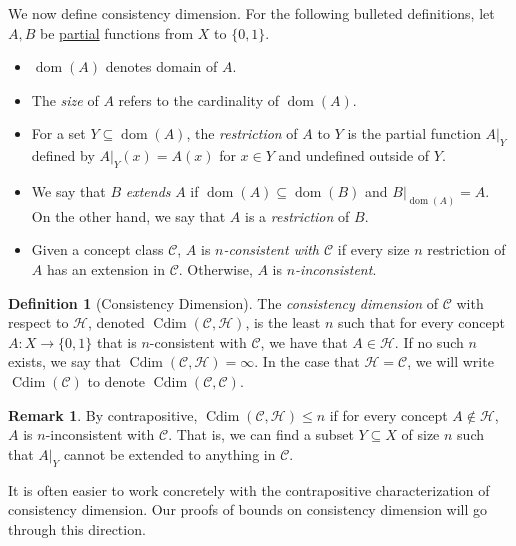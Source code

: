 \documentclass[11pt,a4paper]{amsart}
\theoremstyle{definition}
\newtheorem{definition}{Definition}
\newtheorem{remark}{Remark}
\newcommand{\mc}{\mathcal}
\DeclareMathOperator{\dom}{dom}
\DeclareMathOperator{\Cdim}{Cdim}
\DeclareMathOperator{\SCdim}{SCdim}
\begin{document}
We now define consistency dimension.
For the following bulleted definitions, let $A,B$ be \underline{partial} functions from $X$ to $\{0,1\}$.
\begin{itemize}
    \item $\dom(A)$ denotes domain of $A$.
    \item The \emph{size} of $A$ refers to the cardinality of $\dom(A)$.
    \item For a set $Y \subseteq \dom(A)$, the \emph{restriction} of $A$ to $Y$ is the partial function $A|_Y$ defined by $A|_Y(x) = A(x)$ for $x \in Y$ and undefined outside of $Y$.
    \item We say that $B$ \emph{extends} $A$ if $\dom(A) \subseteq \dom(B)$ and $B|_{\dom(A)} = A$. 
    On the other hand, we say that $A$ is a \emph{restriction} of $B$. 
    \item Given a concept class $\mc C$, $A$ is \emph{$n$-consistent with $\mc C$} if every size $n$ restriction of $A$ has an extension in $\mc C$. 
    Otherwise, $A$ is \emph{$n$-inconsistent}. 
\end{itemize}

\begin{definition}[Consistency Dimension]
    The \emph{consistency dimension} of $\mc C$ with respect to $\mc H$, denoted $\Cdim(\mc C, \mc H)$, is the least $n$ such that for every concept $A : X \to \{0,1\}$ that is $n$-consistent with $\mc C$, we have that $A \in \mc H$. 
    If no such $n$ exists, we say that $\Cdim(\mc C, \mc H) = \infty$. 
    In the case that $\mc H = \mc C$, we will write $\Cdim(\mc C)$ to denote $\Cdim(\mc C, \mc C)$. 
\end{definition}

\begin{remark}
    By contrapositive, $\Cdim(\mc C, \mc H) \leq n$ if for every concept $A \notin \mc H$, $A$ is $n$-inconsistent with $\mc C$. That is, we can find a subset $Y \subseteq X$ of size $n$ such that $A|_Y$ cannot be extended to anything in $\mc C$. 
\end{remark}

It is often easier to work concretely with the contrapositive characterization of consistency dimension. 
Our proofs of bounds on consistency dimension will go through this direction.

\end{document}
